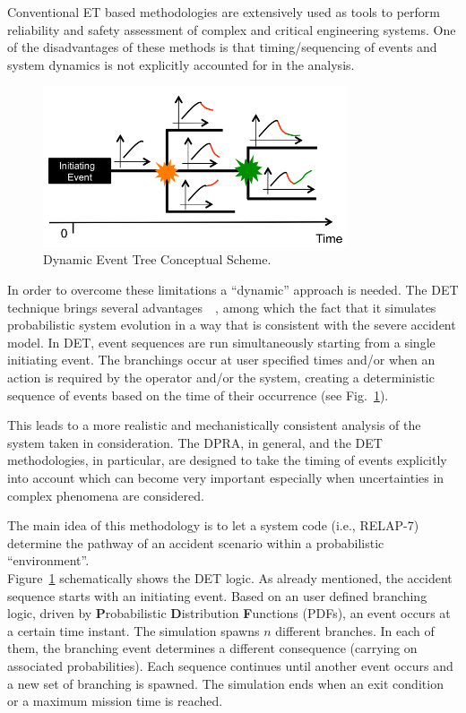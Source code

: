 \label{sec:det}
Conventional ET based methodologies are extensively used as tools to perform reliability and safety assessment of complex and critical engineering systems. 
One of the disadvantages of these methods is that timing/sequencing of events and system dynamics is not explicitly accounted for in the analysis.

\begin{figure}[h] 
  \centering
     \includegraphics[width=0.8\textwidth]{figures/DET_schemeFlow.png}
  \caption{Dynamic Event Tree Conceptual Scheme.}
   \label{fig:DET_schemeFlow}
\end{figure}
In order to overcome these limitations a ``dynamic'' approach is needed. The DET technique brings several advantages~\cite{alfonsiPSA}~\cite{ADAPTHakobyan}, among which the fact that it simulates probabilistic system evolution in a way that is consistent with the severe accident model. In DET,  event sequences are run simultaneously starting from a single initiating event. The branchings occur at user specified times and/or when an action is required by the operator and/or the system, creating a deterministic sequence of events based on the time of their occurrence (see Fig.~\ref{fig:DET_schemeFlow}). 

This leads to a more realistic and mechanistically consistent analysis of the system taken in consideration. The DPRA, in general, and the DET methodologies, in particular, are designed to take the timing of events explicitly into account which can become very important especially when uncertainties in complex phenomena are considered. 

The main idea of this methodology is to let a system code (i.e., RELAP-7) determine the pathway of an accident scenario within a probabilistic ``environment''. \\ Figure~\ref{fig:DET_schemeFlow} schematically shows the DET logic. As already mentioned, the accident sequence starts with an initiating event. Based on an user defined branching logic, driven by \textbf{P}robabilistic \textbf{D}istribution \textbf{F}unctions (PDFs), an event occurs at a certain time instant. The simulation spawns $n$ different branches. In each of them, the branching event determines a different consequence (carrying on associated probabilities). Each sequence continues until another event occurs and a new set of branching is spawned. The simulation ends when an exit condition or a maximum mission time is reached.
